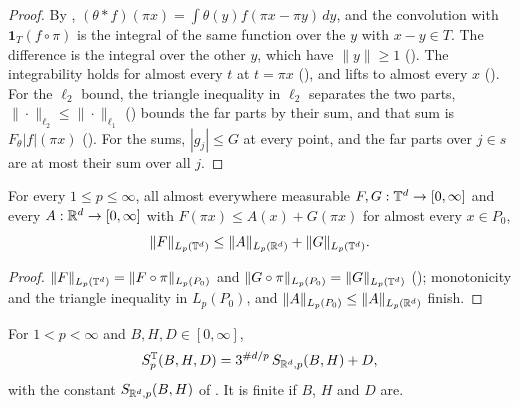 \begin{proof}
\leanok
By , $(\theta * f)(\pi x) = \int \theta(y) f(\pi x - \pi y) \, dy$, and
the convolution with $\mathbf 1_T (f \circ \pi)$ is the integral of the same function over the
$y$ with $x - y \in T$. The difference is the integral over the other $y$, which have
$\|y\| \geq 1$ (). The integrability holds for almost every $t$ at
$t = \pi x$ (), and lifts to almost every $x$
(). For the $\ell_2$ bound, the triangle inequality in $\ell_2$
separates the two parts, $\|\cdot\|_{\ell_2} \leq \|\cdot\|_{\ell_1}$ () bounds
the far parts by their sum, and that sum is $F_\theta |f| (\pi x)$
(). For the sums, $|g_j| \leq G$ at every point, and the far parts
over $j \in s$ are at most their sum over all $j$.
\end{proof}

\begin{lemma}
\label{lem:torus-period-box-split}
\leanok
{}
For every $1 \leq p \leq \infty$, all almost everywhere measurable $F, G : \mathbb{T}^d \to [0, \infty]$
and every $A : \mathbb{R}^d \to [0, \infty]$ with $F(\pi x) \leq A(x) + G(\pi x)$ for almost every
$x \in P_0$,
\[
  \|F\|_{L_p(\mathbb{T}^d)} \leq \|A\|_{L_p(\mathbb{R}^d)} + \|G\|_{L_p(\mathbb{T}^d)} .
\]
\end{lemma}

\begin{proof}
\leanok
$\|F\|_{L_p(\mathbb{T}^d)} = \|F \circ \pi\|_{L_p(P_0)}$ and
$\|G \circ \pi\|_{L_p(P_0)} = \|G\|_{L_p(\mathbb{T}^d)}$ (); monotonicity
and the triangle inequality in $L_p(P_0)$, and $\|A\|_{L_p(P_0)} \leq \|A\|_{L_p(\mathbb{R}^d)}$ finish.
\end{proof}

\begin{definition}
\label{def:periodic-cz-const}
\leanok
{}
For $1 < p < \infty$ and $B, H, D \in [0, \infty]$,
\[
  S^{\mathbb{T}}_{p}(B, H, D) = 3^{\#d/p} \, S_{\mathbb{R}^d,p}(B, H) + D ,
\]
with the constant $S_{\mathbb{R}^d,p}(B, H)$ of . It is finite if $B$, $H$ and $D$
are.
\end{definition}

